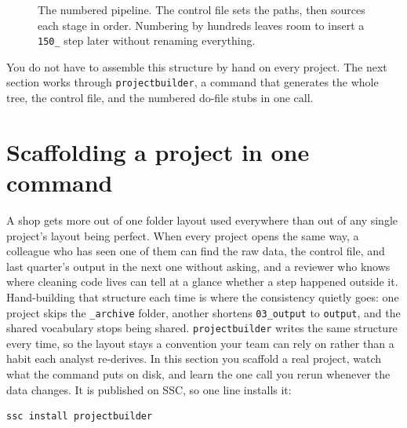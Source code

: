 \begin{figure}[htbp]
\centering
{}
\caption[The numbered pipeline]{The numbered pipeline. The control file sets the paths, then sources each stage in order. Numbering by hundreds leaves room to insert a \texttt{150\_} step later without renaming everything.}
\label{fig:numbered}
\end{figure}

You do not have to assemble this structure by hand on every project. The next section works through \texttt{projectbuilder}, a command that generates the whole tree, the control file, and the numbered do-file stubs in one call.

\section{Scaffolding a project in one command}\label{sec:ch02-projectbuilder}
A shop gets more out of one folder layout used everywhere than out of any single project's layout being perfect. When every project opens the same way, a colleague who has seen one of them can find the raw data, the control file, and last quarter's output in the next one without asking, and a reviewer who knows where cleaning code lives can tell at a glance whether a step happened outside it. Hand-building that structure each time is where the consistency quietly goes: one project skips the \texttt{\_archive} folder, another shortens \texttt{03\_output} to \texttt{output}, and the shared vocabulary stops being shared. \texttt{projectbuilder} writes the same structure every time, so the layout stays a convention your team can rely on rather than a habit each analyst re-derives. In this section you scaffold a real project, watch what the command puts on disk, and learn the one call you rerun whenever the data changes. It is published on SSC, so one line installs it:
\par
{\footnotesize
\begin{verbatim}
ssc install projectbuilder
\end{verbatim}
}

